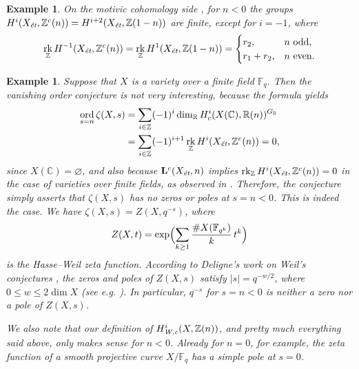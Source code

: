 \documentclass[10pt,a4paper,oneside,draft]{article}
\DeclareMathOperator{\ord}{ord}
\DeclareMathOperator{\rk}{rk}
\newcommand{\CC}{\mathbb{C}}
\newcommand{\FF}{\mathbb{F}}
\newcommand{\RR}{\mathbb{R}}
\newcommand{\ZZ}{\mathbb{Z}}
\renewcommand{\emptyset}{\varnothing}
\newcommand{\et}{\text{\it \'{e}t}}
\newcommand{\Wc}{\text{\it W,c}}
\theoremstyle{myplain}
\theoremstyle{mydefinition}
\newtheorem{example}[theorem]{Example}
\numberwithin{equation}{section}
\begin{document}
\begin{example}
  On the motivic cohomology side \cite[Proposition~4.14]{Geisser-2017}, for
  $n < 0$ the groups $H^i (X_\et, \ZZ^c (n)) = H^{i+2} (X_\et, \ZZ (1-n))$ are
  finite, except for $i = -1$, where
  \[ \rk_\ZZ H^{-1} (X_\et, \ZZ^c (n)) =
    \rk_\ZZ H^1 (X_\et, \ZZ (1-n)) = \begin{cases}
      r_2, & n \text{ odd},\\
      r_1 + r_2, & n \text{ even}.
    \end{cases} \]
\end{example}

\begin{example}
  Suppose that $X$ is a variety over a finite field $\FF_q$. Then the vanishing
  order conjecture is not very interesting, because the formula yields
  \begin{align*}
    \ord_{s=n} \zeta (X,s) & = \sum_{i \in \ZZ} (-1)^i \dim_\RR H^i_c (X(\CC), \RR (n))^{G_\RR} \\
                           & = \sum_{i \in \ZZ} (-1)^{i+1} \rk_\ZZ H^i (X_\et, \ZZ^c (n)) = 0,
  \end{align*}
  since $X (\CC) = \emptyset$, and also because $\mathbf{L}^c (X_\et, n)$
  implies $\rk_\ZZ H^i (X_\et, \ZZ^c (n)) = 0$ in the case of varieties over
  finite fields, as observed in
  \cite[Proposition~4.2]{Beshenov-Weil-etale-1}. Therefore, the conjecture
  simply asserts that $\zeta (X,s)$ has no zeros or poles at $s = n < 0$.
  This is indeed the case. We have $\zeta (X,s) = Z (X,q^{-s})$, where
  $$Z (X,t) = \exp \Bigl(\sum_{k\ge 1} \frac{\# X (\FF_{q^k})}{k}\,t^k\Bigr)$$
  is the Hasse--Weil zeta function. According to Deligne's work on Weil's
  conjectures \cite{Deligne-Weil-II}, the zeros and poles of $Z (X,s)$ satisfy
  $|s| = q^{-w/2}$, where $0 \le w \le 2 \dim X$ (see
  e.g. \cite[pp.\,26--27]{Katz-1994}). In particular, $q^{-s}$ for $s = n < 0$
  is neither a zero nor a pole of $Z (X,s)$.

  We also note that our definition of $H^i_\Wc (X, \ZZ(n))$, and pretty much
  everything said above, only makes sense for $n < 0$. Already for $n = 0$, for
  example, the zeta function of a smooth projective curve $X/\FF_q$ has a simple
  pole at $s = 0$.
\end{example}
\end{document}
